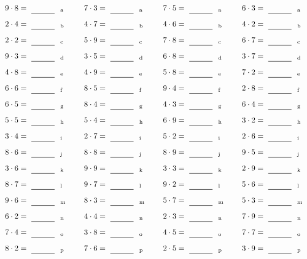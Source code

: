 \documentclass
[
  draft    = true,
  fontsize = 11pt,
  parskip  = half-
]
{scrartcl}
\begin{document}
\par\vfill\par
\begin{align*}
    \pline{9\cdot8}&=\rline{a}
  & \pline{7\cdot3}&=\rline{a}
  & \pline{7\cdot5}&=\rline{a}
  & \pline{6\cdot3}&=\rline{a} \\[1ex]
    \pline{2\cdot4}&=\rline{b}
  & \pline{4\cdot7}&=\rline{b}
  & \pline{4\cdot6}&=\rline{b}
  & \pline{4\cdot2}&=\rline{b} \\[1ex]
    \pline{2\cdot2}&=\rline{c}
  & \pline{5\cdot9}&=\rline{c}
  & \pline{7\cdot8}&=\rline{c}
  & \pline{6\cdot7}&=\rline{c} \\[1ex]
    \pline{9\cdot3}&=\rline{d}
  & \pline{3\cdot5}&=\rline{d}
  & \pline{6\cdot8}&=\rline{d}
  & \pline{3\cdot7}&=\rline{d} \\[1ex]
    \pline{4\cdot8}&=\rline{e}
  & \pline{4\cdot9}&=\rline{e}
  & \pline{5\cdot8}&=\rline{e}
  & \pline{7\cdot2}&=\rline{e} \\[1ex]
    \pline{6\cdot6}&=\rline{f}
  & \pline{8\cdot5}&=\rline{f}
  & \pline{9\cdot4}&=\rline{f}
  & \pline{2\cdot8}&=\rline{f} \\[1ex]
    \pline{6\cdot5}&=\rline{g}
  & \pline{8\cdot4}&=\rline{g}
  & \pline{4\cdot3}&=\rline{g}
  & \pline{6\cdot4}&=\rline{g} \\[1ex]
    \pline{5\cdot5}&=\rline{h}
  & \pline{5\cdot4}&=\rline{h}
  & \pline{6\cdot9}&=\rline{h}
  & \pline{3\cdot2}&=\rline{h} \\[1ex]
    \pline{3\cdot4}&=\rline{i}
  & \pline{2\cdot7}&=\rline{i}
  & \pline{5\cdot2}&=\rline{i}
  & \pline{2\cdot6}&=\rline{i} \\[1ex]
    \pline{8\cdot6}&=\rline{j}
  & \pline{8\cdot8}&=\rline{j}
  & \pline{8\cdot9}&=\rline{j}
  & \pline{9\cdot5}&=\rline{j} \\[1ex]
    \pline{3\cdot6}&=\rline{k}
  & \pline{9\cdot9}&=\rline{k}
  & \pline{3\cdot3}&=\rline{k}
  & \pline{2\cdot9}&=\rline{k} \\[1ex]
    \pline{8\cdot7}&=\rline{l}
  & \pline{9\cdot7}&=\rline{l}
  & \pline{9\cdot2}&=\rline{l}
  & \pline{5\cdot6}&=\rline{l} \\[1ex]
    \pline{9\cdot6}&=\rline{m}
  & \pline{8\cdot3}&=\rline{m}
  & \pline{5\cdot7}&=\rline{m}
  & \pline{5\cdot3}&=\rline{m} \\[1ex]
    \pline{6\cdot2}&=\rline{n}
  & \pline{4\cdot4}&=\rline{n}
  & \pline{2\cdot3}&=\rline{n}
  & \pline{7\cdot9}&=\rline{n} \\[1ex]
    \pline{7\cdot4}&=\rline{o}
  & \pline{3\cdot8}&=\rline{o}
  & \pline{4\cdot5}&=\rline{o}
  & \pline{7\cdot7}&=\rline{o} \\[1ex]
    \pline{8\cdot2}&=\rline{p}
  & \pline{7\cdot6}&=\rline{p}
  & \pline{2\cdot5}&=\rline{p}
  & \pline{3\cdot9}&=\rline{p}
\end{align*}
\end{document}
